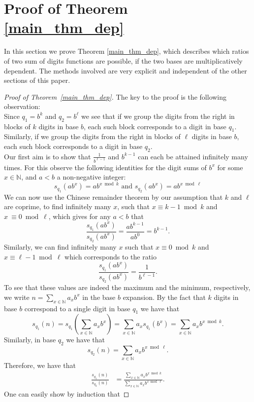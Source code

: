 \documentclass[12pt]{amsart}
\theoremstyle{definition}
\numberwithin{equation}{section}
\newcommand\NN{\mathbb{N}}
\numberwithin{equation}{section}
\begin{document}
\section{Proof of Theorem \ref{main_thm_dep}}\label{sec_Proof_of_dep}
In this section we prove Theorem \ref{main_thm_dep}, which describes which ratios of two sum of digits functions are possible, if the two bases are multiplicatively dependent. The methods involved are very explicit and independent of the other sections of this paper.
\begin{proof}[Proof of Theorem~\ref{main_thm_dep}]
	The key to the proof is the following observation:\\
	Since $q_1=b^k$ and $q_2=b^{\ell}$ we see that if we group the digits from the right in blocks of $k$ digits in base $b$, each such block corresponds to a digit in base $q_1$. Similarly, if we group the digits from the right in blocks of $\ell$ digits in base $b$, each such block corresponds to a digit in base $q_2$.\\
	Our first aim is to show that $\frac{1}{b^{\ell-1}}$ and $b^{k-1}$ can each be attained infinitely many times. For this observe the following identities for the digit sums of $b^x$ for some $x\in \NN$, and $a < b$ a non-negative integer:
	\[
	s_{q_1}(ab^x)=ab^{x\bmod k} \text{ and } s_{q_2}(ab^x)=ab^{x\bmod \ell}
	\]
	We can now use the Chinese remainder theorem by our assumption that $k$ and $\ell$ are coprime, to find infinitely many $x$, such that $x\equiv k-1 \bmod k$ and $x~\equiv 0 \bmod \ell$, which gives for any $a< b$ that
	\[
	\frac{s_{q_1}(ab^x)}{s_{q_2}(ab^x)}=\frac{ab^{k-1}}{ab^0}=b^{k-1}.
	\]
	Similarly, we can find infinitely many $x$ such that $x \equiv 0 \bmod k$ and $x\equiv \ell -1 \bmod \ell$ which corresponds to the ratio
	\[
	\frac{s_{q_1}(ab^x)}{s_{q_2}(ab^x)}=\frac{1}{b^{\ell-1}}.
	\]
	To see that these values are indeed the maximum and the minimum, respectively, we write $n=\sum_{x\in \NN}a_xb^x$ in the base $b$ expansion. By the fact that $k$ digits in base $b$ correspond to a single digit in base $q_1$ we have that 
	\[
	s_{q_1}(n) = s_{q_1}\left(\sum_{x\in \NN}a_xb^x\right) = \sum_{x\in \NN}a_xs_{q_1}(b^x)=\sum_{x\in \NN}a_xb^{x\bmod k}.
	\]
	Similarly, in base $q_2$ we have that
	\[
	s_{q_2}(n) =\sum_{x\in \NN}a_xb^{x\bmod \ell}.
	\]
	Therefore, we have that
	\begin{align*}
		\frac{s_{q_1}(n)}{s_{q_2}(n)} &= \frac{\sum_{x\in \NN}a_xb^{x\bmod k}}{\sum_{x\in \NN}a_xb^{x\bmod \ell}}.
	\end{align*}
	One can easily show by induction that

\end{proof}
\end{document}
